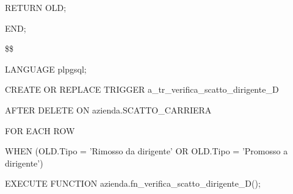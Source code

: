 \begin{flushleft}
\begin{description}
\begin{description}
                        \item RETURN OLD;
                    \end{description}
                    \item END;
                    \item \$\$
                    \item LANGUAGE plpgsql;
                \end{description}
            \end{flushleft}
        \normalfont

        \ttfamily
            \begin{flushleft}
                \begin{description}
                    \item CREATE OR REPLACE TRIGGER a\_tr\_verifica\_scatto\_dirigente\_D
                    \item AFTER DELETE ON azienda.SCATTO\_CARRIERA
                    \item FOR EACH ROW
                    \item WHEN (OLD.Tipo = 'Rimosso da dirigente' OR OLD.Tipo = 'Promosso a dirigente')
                    \item EXECUTE FUNCTION azienda.fn\_verifica\_scatto\_dirigente\_D();
                \end{description}
            \end{flushleft}
        \normalfont


\newpage

